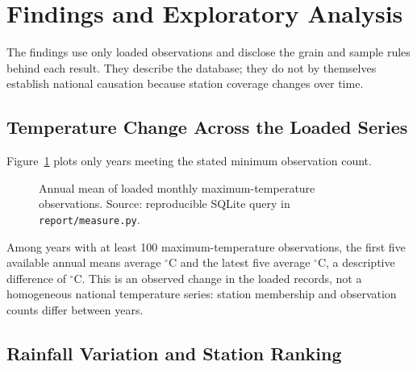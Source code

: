 \section{Findings and Exploratory Analysis}
\label{sec:findings}

The findings use only loaded observations and disclose the grain and sample
rules behind each result. They describe the database; they do not by themselves
establish national causation because station coverage changes over time.

\subsection{Temperature Change Across the Loaded Series}
\label{subsec:temperature-findings}

Figure~\ref{fig:annual-temperature} plots only years meeting the stated
minimum observation count.

\begin{figure}[H]
\centering
{}
\caption{Annual mean of loaded monthly maximum-temperature observations.
Source: reproducible SQLite query in \texttt{report/measure.py}.}
\label{fig:annual-temperature}
\end{figure}

Among years with at least 100 maximum-temperature observations, the first five
available annual means average \mTempEarlyMean$^\circ$C and the latest five
average \mTempRecentMean$^\circ$C, a descriptive difference of
\mTempDifference$^\circ$C. This is an observed change in the loaded records,
not a homogeneous national temperature series: station membership and
observation counts differ between years.

\subsection{Rainfall Variation and Station Ranking}
\label{subsec:rainfall-findings}

